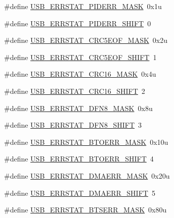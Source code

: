 \begin{DoxyCompactItemize}
\#define \hyperlink{group___u_s_b___register___masks_gadf359cce923ca198235ecef76b5cc789}{U\+S\+B\+\_\+\+E\+R\+R\+S\+T\+A\+T\+\_\+\+P\+I\+D\+E\+R\+R\+\_\+\+M\+A\+SK}~0x1u
\item 
\#define \hyperlink{group___u_s_b___register___masks_gaf10f584ce9bbe8d7c0d0b8a6a4f61352}{U\+S\+B\+\_\+\+E\+R\+R\+S\+T\+A\+T\+\_\+\+P\+I\+D\+E\+R\+R\+\_\+\+S\+H\+I\+FT}~0
\item 
\#define \hyperlink{group___u_s_b___register___masks_ga400a9d616bd8457e1003d62d62660b5a}{U\+S\+B\+\_\+\+E\+R\+R\+S\+T\+A\+T\+\_\+\+C\+R\+C5\+E\+O\+F\+\_\+\+M\+A\+SK}~0x2u
\item 
\#define \hyperlink{group___u_s_b___register___masks_ga42e986ec54195657a22043422895c708}{U\+S\+B\+\_\+\+E\+R\+R\+S\+T\+A\+T\+\_\+\+C\+R\+C5\+E\+O\+F\+\_\+\+S\+H\+I\+FT}~1
\item 
\#define \hyperlink{group___u_s_b___register___masks_gac9682448ca13abab007c9438e811610c}{U\+S\+B\+\_\+\+E\+R\+R\+S\+T\+A\+T\+\_\+\+C\+R\+C16\+\_\+\+M\+A\+SK}~0x4u
\item 
\#define \hyperlink{group___u_s_b___register___masks_gaf0bd8a085cd33bc98cf89d6ea726be46}{U\+S\+B\+\_\+\+E\+R\+R\+S\+T\+A\+T\+\_\+\+C\+R\+C16\+\_\+\+S\+H\+I\+FT}~2
\item 
\#define \hyperlink{group___u_s_b___register___masks_gaf2aaf7552c127da34a4252936afe561a}{U\+S\+B\+\_\+\+E\+R\+R\+S\+T\+A\+T\+\_\+\+D\+F\+N8\+\_\+\+M\+A\+SK}~0x8u
\item 
\#define \hyperlink{group___u_s_b___register___masks_gae26a3aed245ac0546edc65afaa2c5542}{U\+S\+B\+\_\+\+E\+R\+R\+S\+T\+A\+T\+\_\+\+D\+F\+N8\+\_\+\+S\+H\+I\+FT}~3
\item 
\#define \hyperlink{group___u_s_b___register___masks_ga64f9bd307b556ecbd454571aa2d1b4c8}{U\+S\+B\+\_\+\+E\+R\+R\+S\+T\+A\+T\+\_\+\+B\+T\+O\+E\+R\+R\+\_\+\+M\+A\+SK}~0x10u
\item 
\#define \hyperlink{group___u_s_b___register___masks_gaa6f963350f684e982457839f7bc842e5}{U\+S\+B\+\_\+\+E\+R\+R\+S\+T\+A\+T\+\_\+\+B\+T\+O\+E\+R\+R\+\_\+\+S\+H\+I\+FT}~4
\item 
\#define \hyperlink{group___u_s_b___register___masks_ga3941bf3fbbca724b3b26a09bb2432581}{U\+S\+B\+\_\+\+E\+R\+R\+S\+T\+A\+T\+\_\+\+D\+M\+A\+E\+R\+R\+\_\+\+M\+A\+SK}~0x20u
\item 
\#define \hyperlink{group___u_s_b___register___masks_ga2e3f280874ee203f1f801206ab4254be}{U\+S\+B\+\_\+\+E\+R\+R\+S\+T\+A\+T\+\_\+\+D\+M\+A\+E\+R\+R\+\_\+\+S\+H\+I\+FT}~5
\item 
\#define \hyperlink{group___u_s_b___register___masks_ga9cfa1a07c56005e5d545ecf363c4e916}{U\+S\+B\+\_\+\+E\+R\+R\+S\+T\+A\+T\+\_\+\+B\+T\+S\+E\+R\+R\+\_\+\+M\+A\+SK}~0x80u

\end{DoxyCompactItemize}
